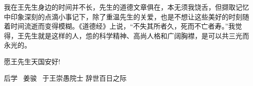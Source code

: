 我在王先生身边的时间并不长，先生的道德文章俱在，本无须我饶舌，但撷取记忆中印象深刻的点滴小事记下，除了重温先生的关爱，也是不想让这些美好的时刻随着时间流逝而变得模糊。《道德经》上说，``不失其所者久，死而不亡者寿。''我觉得，王先生就是这样的人，怹的科学精神、高尚人格和广阔胸襟，是可以共三光而永光的。

愿王先生天国安好!

\begin{flushright}
\textrm{后学~ 姜骏~ 于王崇愚院士 辞世百日之际~~}
\end{flushright}
